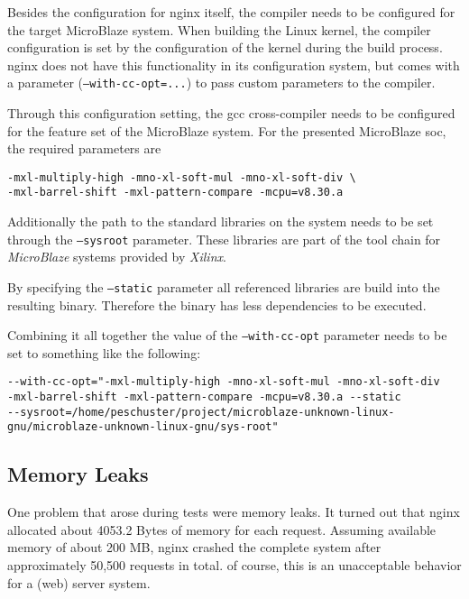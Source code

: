 Besides the configuration for nginx itself, the compiler needs to be configured for the target MicroBlaze system. When building the Linux kernel, the compiler configuration is set by the configuration of the kernel during the build process. nginx does not have this functionality in its configuration system, but comes with a parameter (\texttt{--with-cc-opt=...}) to pass custom parameters to the compiler.

Through this configuration setting, the gcc cross-compiler needs to be configured for the feature set of the MicroBlaze system. For the presented MicroBlaze \gls{soc}, the required parameters are

\begin{verbatim}
-mxl-multiply-high -mno-xl-soft-mul -mno-xl-soft-div \
-mxl-barrel-shift -mxl-pattern-compare -mcpu=v8.30.a
\end{verbatim}

Additionally the path to the standard libraries on the system needs to be set through the \texttt{--sysroot} parameter. These libraries are part of the tool chain for \textit{MicroBlaze} systems provided by \textit{Xilinx}. 

By specifying the \texttt{--static} parameter all referenced libraries are build into the resulting binary. Therefore the binary has less dependencies to be executed.

Combining it all together the value of the \texttt{--with-cc-opt} parameter needs to be set to something like the following: 

\begin{verbatim}
--with-cc-opt="-mxl-multiply-high -mno-xl-soft-mul -mno-xl-soft-div 
-mxl-barrel-shift -mxl-pattern-compare -mcpu=v8.30.a --static 
--sysroot=/home/peschuster/project/microblaze-unknown-linux-gnu/microblaze-unknown-linux-gnu/sys-root"
\end{verbatim}

\subsection{Memory Leaks}

One problem that arose during tests were memory leaks. It turned out that nginx allocated about 4053.2 Bytes of memory for each request. Assuming available memory of about 200 MB, nginx crashed the complete system after approximately 50,500 requests in total. of course, this is an unacceptable behavior for a (web) server system.


